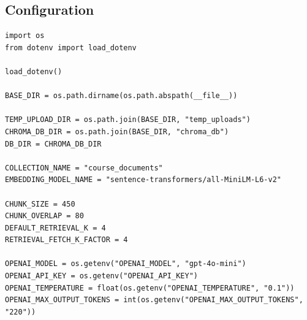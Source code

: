 \documentclass[12pt,a4paper]{article}
\begin{document}
\subsection*{Configuration}
\begin{lstlisting}[caption={config.py}]
import os
from dotenv import load_dotenv

load_dotenv()

BASE_DIR = os.path.dirname(os.path.abspath(__file__))

TEMP_UPLOAD_DIR = os.path.join(BASE_DIR, "temp_uploads")
CHROMA_DB_DIR = os.path.join(BASE_DIR, "chroma_db")
DB_DIR = CHROMA_DB_DIR

COLLECTION_NAME = "course_documents"
EMBEDDING_MODEL_NAME = "sentence-transformers/all-MiniLM-L6-v2"

CHUNK_SIZE = 450
CHUNK_OVERLAP = 80
DEFAULT_RETRIEVAL_K = 4
RETRIEVAL_FETCH_K_FACTOR = 4

OPENAI_MODEL = os.getenv("OPENAI_MODEL", "gpt-4o-mini")
OPENAI_API_KEY = os.getenv("OPENAI_API_KEY")
OPENAI_TEMPERATURE = float(os.getenv("OPENAI_TEMPERATURE", "0.1"))
OPENAI_MAX_OUTPUT_TOKENS = int(os.getenv("OPENAI_MAX_OUTPUT_TOKENS", "220"))
\end{lstlisting}
\end{document}

